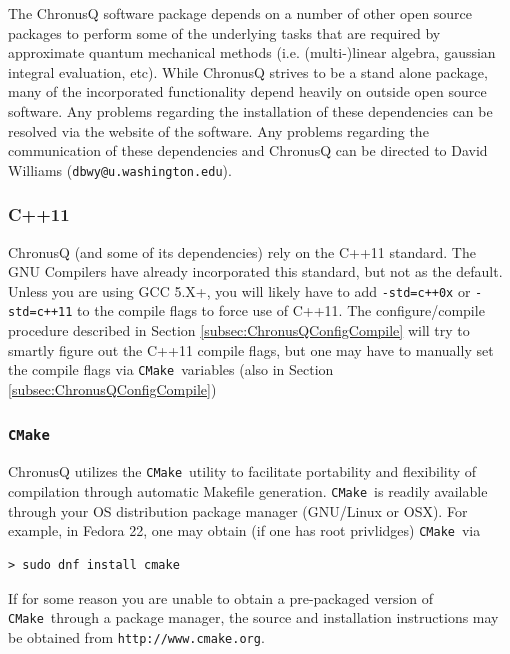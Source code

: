 \documentclass[12pt]{article}
\makeatletter
\newcommand{\DBWYContact}{David Williams (\texttt{dbwy@u.washington.edu})}
\newcommand{\CMake}{\texttt{CMake}}
\makeatother
\begin{document}
    The ChronusQ software package depends on a number of other open source packages
    to perform some of the underlying tasks that are required by approximate
    quantum mechanical methods (i.e. (multi-)linear algebra, gaussian integral 
    evaluation, etc). While ChronusQ strives to be a stand alone package, many
    of the incorporated functionality depend heavily on outside open source 
    software. Any problems regarding the installation of these dependencies can
    be resolved via the website of the software. Any problems regarding the
    communication of these dependencies and ChronusQ can be directed to
    \DBWYContact.
    
    
      \subsubsection{C++11} \label{subsubsec:C++11} 
        ChronusQ (and some of its dependencies) rely on the C++11 
        standard. The GNU Compilers have already incorporated this standard, but
	not as the default. Unless you are using GCC 5.X+, you will likely have
	to add \texttt{-std=c++0x} or \texttt{-std=c++11} to the compile flags
	to force use of C++11. The configure/compile procedure described in
	Section \ref{subsec:ChronusQConfigCompile} will try to smartly figure out
	the C++11 compile flags, but one may have to manually set the compile flags
	via \CMake~variables (also in Section \ref{subsec:ChronusQConfigCompile})

      \subsubsection{\CMake} \label{subsubsec:cmake} 
        ChronusQ utilizes the \CMake~utility to facilitate
        portability and flexibility of compilation through automatic Makefile 
	generation. \CMake~is readily available through your OS distribution
	package manager (GNU/Linux or OSX). For example, in Fedora 22, one may 
	obtain (if one has root privlidges) \CMake~via

	\begin{lstlisting}
> sudo dnf install cmake
	\end{lstlisting}

	\noindent If for some reason you are unable to obtain a pre-packaged 
	version of \CMake~through a package manager, the source and installation 
	instructions may be obtained from \texttt{http://www.cmake.org}.
\end{document}
